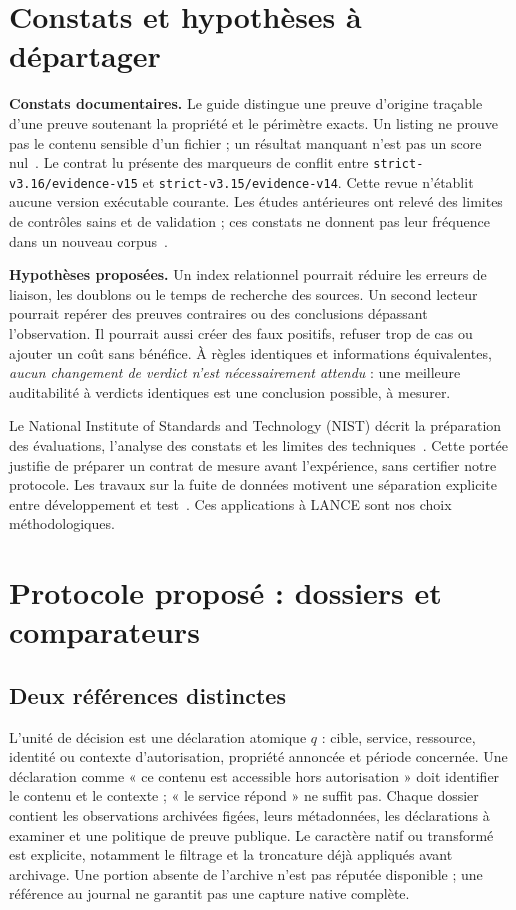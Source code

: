 \documentclass[11pt,a4paper]{article}
\newcommand{\fichier}[1]{\nolinkurl{#1}}
\begin{document}
\section{Constats et hypothèses à départager}
\textbf{Constats documentaires.} Le guide distingue une preuve d'origine
traçable d'une preuve soutenant la propriété et le périmètre exacts. Un listing
ne prouve pas le contenu sensible d'un fichier ; un résultat manquant n'est pas
un score nul~\cite{local-evaluation}. Le contrat lu présente des marqueurs de
conflit entre \fichier{strict-v3.16/evidence-v15} et
\fichier{strict-v3.15/evidence-v14}. Cette revue n'établit aucune version
exécutable courante. Les études antérieures ont relevé des limites de contrôles
sains et de validation ; ces constats ne donnent pas leur fréquence dans un
nouveau corpus~\cite{local-coverage}.

\textbf{Hypothèses proposées.} Un index relationnel pourrait réduire les
erreurs de liaison, les doublons ou le temps de recherche des sources. Un second
lecteur pourrait repérer des preuves contraires ou des conclusions dépassant
l'observation. Il pourrait aussi créer des faux positifs, refuser trop de cas ou
ajouter un coût sans bénéfice. À règles identiques et informations équivalentes,
\emph{aucun changement de verdict n'est nécessairement attendu} : une meilleure
auditabilité à verdicts identiques est une conclusion possible, à mesurer.

Le National Institute of Standards and Technology (NIST) décrit la préparation
des évaluations, l'analyse des constats et les
limites des techniques~\cite{nist}. Cette portée justifie de préparer un contrat
de mesure avant l'expérience, sans certifier notre protocole. Les travaux sur
la fuite de données motivent une séparation explicite entre développement et
test~\cite{leakage}. Ces applications à LANCE sont nos choix méthodologiques.

\section{Protocole proposé : dossiers et comparateurs}
\subsection{Deux références distinctes}
L'unité de décision est une déclaration atomique $q$ : cible, service,
ressource, identité ou contexte d'autorisation, propriété annoncée et période
concernée. Une déclaration comme « ce contenu est accessible hors autorisation »
doit identifier le contenu et le contexte ; « le service répond » ne suffit pas.
Chaque dossier contient les observations archivées figées, leurs métadonnées,
les déclarations à examiner et une politique de preuve publique. Le caractère
natif ou transformé est explicite, notamment le filtrage et la troncature déjà
appliqués avant archivage. Une portion absente de l'archive n'est pas réputée
disponible ; une référence au journal ne garantit pas une capture native complète.
\end{document}
